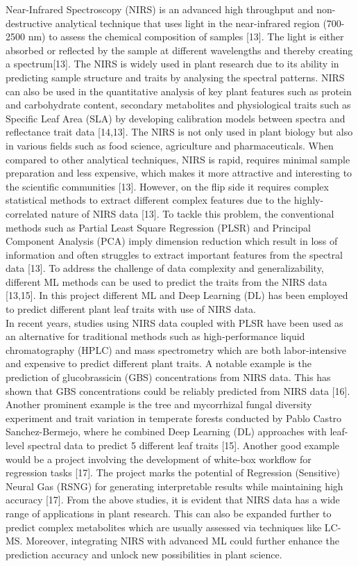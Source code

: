 \documentclass[12pt,a4paper]{report}
\begin{document}
Near-Infrared Spectroscopy (NIRS) is an advanced high throughput and non-destructive analytical technique that uses light in the near-infrared region (700-2500 nm) to assess the chemical composition of samples [13]. The light is either absorbed or reflected by the sample at different wavelengths and thereby creating a spectrum[13]. The NIRS is widely used in plant research due to its ability in predicting sample structure and traits by analysing the spectral patterns.
NIRS can also be used in the quantitative analysis of key plant features such as protein and carbohydrate content, secondary metabolites and physiological traits such as Specific Leaf Area (SLA) by developing calibration models between spectra and reflectance trait data [14,13]. The NIRS is not only used in plant biology but also in various fields such as food science, agriculture and pharmaceuticals. When compared to other analytical techniques, NIRS is rapid, 
requires minimal sample preparation and less expensive, which makes it more attractive and interesting to the scientific communities [13]. However, on the flip side it requires complex statistical methods to extract different complex features due to the highly-correlated nature of NIRS data [13]. To tackle this problem, the conventional methods such as Partial Least Square Regression (PLSR) and Principal Component Analysis (PCA) imply dimension reduction which 
result in loss of information and often struggles to extract important features from the spectral data [13]. To address the challenge of data complexity and generalizability, different ML methods can be used to predict the traits from the NIRS data [13,15]. In this project different ML and Deep Learning (DL) has been employed to predict different plant leaf traits with use of NIRS data. \\


In recent years, studies using NIRS data coupled with PLSR have been used as an alternative for traditional methods such as high-performance liquid chromatography (HPLC) and mass spectrometry which are both labor-intensive and expensive to predict different plant traits. A notable example is the prediction of glucobrassicin (GBS) concentrations from NIRS data. This has shown that GBS 
concentrations could be reliably predicted from NIRS data [16]. Another prominent example is the tree and mycorrhizal fungal diversity experiment and  trait variation in temperate forests  conducted by Pablo Castro Sanchez-Bermejo, where he combined Deep Learning (DL) approaches with leaf-level spectral data to predict 5 different leaf traits [15]. Another good  example would be a 
project involving the development of white-box  workflow for regression tasks [17]. The project marks the potential of Regression (Sensitive) Neural Gas (RSNG) for generating interpretable results while maintaining high accuracy [17]. From the above studies, it is evident that NIRS data has a wide range of applications in plant research. This can also be expanded further to predict 
complex metabolites which are usually assessed via techniques like LC-MS. Moreover, integrating NIRS with advanced ML could further enhance the prediction accuracy and unlock new possibilities in plant science. \\
\end{document}
